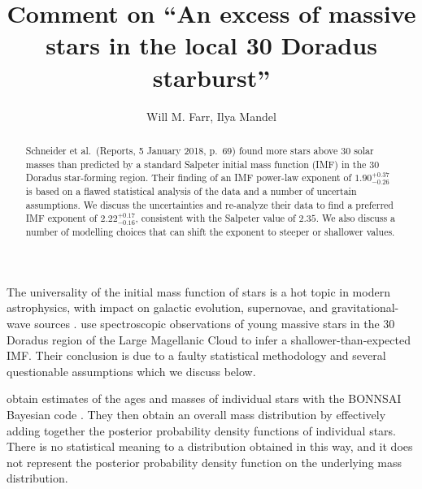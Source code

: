\documentclass[apjl]{emulateapj}
\newcommand{\onesigrange}[3]{\ensuremath{#1^{+#2}_{-#3}}}
\newcommand{\alpharangethree}{\onesigrange{2.22}{0.17}{0.16}}
\begin{document}
\title{Comment on ``An excess of massive stars in the local 30 Doradus starburst''}

\author{Will M. Farr, Ilya Mandel}

\begin{abstract}
Schneider et al.~(Reports, 5 January 2018, p.~69) found more stars above 30 solar masses than predicted by a standard Salpeter initial mass function (IMF) in the 30 Doradus star-forming region.  Their finding of an IMF power-law exponent of $1.90^{+0.37}_{-0.26}$ is based on a flawed statistical analysis of the data and a number of uncertain assumptions.  We discuss the uncertainties and re-analyze their data to find a preferred IMF exponent of $\alpharangethree$, consistent with the Salpeter value of $2.35$.  We also discuss a number of modelling choices that can shift the exponent to steeper or shallower values.
\end{abstract}

\maketitle

The universality of the initial mass function of stars is a hot topic in modern astrophysics, with impact on galactic evolution, supernovae, and gravitational-wave sources \citep{Kroupa:2002,Bastian:2010,deMinkBelczynski:2015}.    \citet{Schneider:2018} use spectroscopic observations of young massive stars in the 30 Doradus region of the Large Magellanic Cloud to infer a shallower-than-expected IMF.  Their conclusion is due to a faulty statistical methodology and several questionable assumptions which we discuss below.

\citet{Schneider:2018} obtain estimates of the ages and masses of individual stars with the BONNSAI Bayesian code \citep{Schneider:2017}.  They then obtain an overall mass distribution by effectively adding together the posterior probability density functions of individual stars.  There is no statistical meaning to a distribution obtained in this way, and it does not represent the posterior probability density function on the underlying mass distribution.  %
\end{document}
